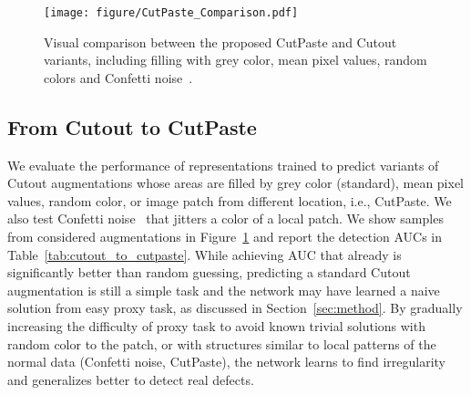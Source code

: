 \documentclass[final]{cvpr}
\begin{document}
\begin{figure}[t]
    \centering
    \texttt{[image: figure/CutPaste\_Comparison.pdf]}
    \vspace{-0.1in}
    \caption{Visual comparison between the proposed CutPaste and Cutout variants, including filling with grey color, mean pixel values, random colors and Confetti noise~\cite{liznerski2020explainable}.  }
    \label{fig:cutout_comparison}
    \vspace{-0.15in}
\end{figure}


\subsection{From Cutout to CutPaste}
\label{sec:abl_Cutout_to_cutpaste}
We evaluate the performance of representations trained to predict variants of Cutout augmentations whose areas are filled by grey color (standard), mean pixel values, random color, or image patch from different location, i.e., CutPaste. We also test Confetti noise~\cite{liznerski2020explainable} that jitters a color of a local patch. 
We show samples from considered augmentations in Figure~\ref{fig:cutout_comparison}
and report the detection AUCs in Table~\ref{tab:cutout_to_cutpaste}.
While achieving  AUC that already is significantly better than random guessing, predicting a standard Cutout augmentation is still a simple task and the network may have learned a naive solution from easy proxy task, as discussed in Section~\ref{sec:method}. By gradually increasing the difficulty of proxy task to avoid known trivial solutions with random color to the patch, or with structures similar to local patterns of the normal data (Confetti noise, CutPaste), the network learns to find irregularity and generalizes better to detect real defects.







\begin{table}[t]
    \centering
    \caption{Detection AUCs of representations trained with binary classification between normal and the union of CutPaste and CutPaste-Scar examples and 3-way classification among normal, CutPaste and CutPaste-scar examples.}
    \label{tab:binary_vs_3way_vs_mix}
    \vspace{-0.1in}
    \vspace{-0.1in}
\end{table}
\end{document}
